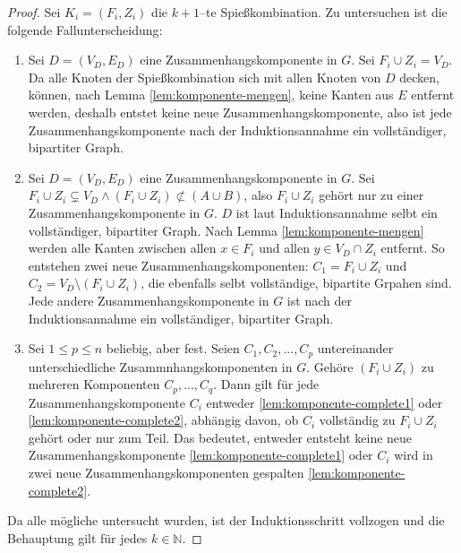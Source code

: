 \begin{proof}
Sei $K_i = (F_i, Z_i)$ die $k+1$--te Spießkombination.
Zu untersuchen ist die folgende Fallunterscheidung:
\begin{enumerate}[label={\upshape(\roman*)}]
  \item Sei $D = (V_D, E_D)$ eine Zusammenhangskomponente in $G$. Sei $F_i \cup Z_i = V_D$.
  Da alle Knoten der Spießkombination sich mit allen Knoten von $D$ decken,
  können, nach Lemma \ref{lem:komponente-mengen}, keine Kanten aus $E$ entfernt werden, deshalb
  entstet keine neue Zusammenhangskomponente, also ist jede Zusammenhangskomponente
  nach der Induktionsannahme ein vollständiger, bipartiter Graph.\label{lem:komponente-complete1} 
  \item Sei $D = (V_D, E_D)$ eine Zusammenhangskomponente in $G$. Sei $F_i \cup Z_i \subsetneq V_D
  \land (F_i \cup Z_i) \not\subset (A \cup B)$, also $F_i \cup Z_i$ gehört nur zu einer
  Zusammenhangskomponente in $G$.
  $D$ ist laut Induktionsannahme selbt ein vollständiger, bipartiter Graph.
  Nach Lemma \ref{lem:komponente-mengen} werden alle Kanten zwischen 
  allen $x \in F_i$ und allen $y \in V_D \cap Z_i$ entfernt.
  So entstehen zwei neue Zusammenhangskomponenten:
  $C_1 = F_i \cup Z_i$ und $C_2 = V_D \setminus (F_i \cup Z_i)$, die ebenfalls selbt 
  vollständige, bipartite Grpahen sind.
  Jede andere Zusammenhangskomponente in $G$ ist
  nach der Induktionsannahme ein vollständiger, bipartiter Graph.\label{lem:komponente-complete2} 
  \item Sei $1 \leqslant p \leqslant n$ beliebig, aber fest.
  Seien $C_1, C_2, ..., C_p$ untereinander unterschiedliche Zusammnhangskomponenten in $G$.
  Gehöre $(F_i \cup Z_i)$ zu mehreren Komponenten $C_p, ..., C_q$.
  Dann gilt für jede Zusammenhangskomponente $C_i$ entweder \ref{lem:komponente-complete1} 
  oder \ref{lem:komponente-complete2}, abhängig davon, ob $C_i$ vollständig zu $F_i \cup Z_i$
  gehört oder nur zum Teil. Das bedeutet, entweder entsteht keine neue Zusammenhangskomponente 
  \ref{lem:komponente-complete1} oder $C_i$ wird in zwei neue Zusammenhangskomponenten gespalten
  \ref{lem:komponente-complete2}.
\end{enumerate}

Da alle mögliche untersucht wurden, ist der Induktionsschritt vollzogen und die Behauptung gilt für jedes
$k \in \mathbb{N}$.
\end{proof}
